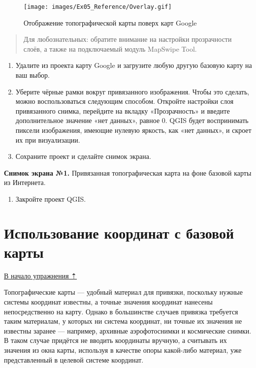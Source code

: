 \documentclass[
  12pt,
]{book}
\providecommand{\tightlist}{%
  \setlength{\itemsep}{0pt}\setlength{\parskip}{0pt}}
\begin{document}
\begin{figure}
\centering
\texttt{[image: images/Ex05\_Reference/Overlay.gif]}
\caption{Отображение топографической карты поверх карт Google}
\end{figure}

\begin{quote}
Для любознательных: обратите внимание на настройки прозрачности слоёв, а также на подключаемый модуль MapSwipe Tool.
\end{quote}

\begin{enumerate}
\def\labelenumi{\arabic{enumi}.}
\setcounter{enumi}{6}
\item
  Удалите из проекта карту Google и загрузите любую другую базовую карту на ваш выбор.
\item
  Уберите чёрные рамки вокруг привязанного изображения. Чтобы это сделать, можно воспользоваться следующим способом. Откройте настройки слоя привязанного снимка, перейдите на вкладку «Прозрачность» и введите дополнительное значение «нет данных», равное 0. QGIS будет воспринимать пиксели изображения, имеющие нулевую яркость, как «нет данных», и скроет их при визуализации.
\item
  Сохраните проект и сделайте снимок экрана.
\end{enumerate}

\textbf{Снимок экрана №1.} Привязанная топографическая карта на фоне базовой карты из Интернета.

\begin{enumerate}
\def\labelenumi{\arabic{enumi}.}
\setcounter{enumi}{9}
\tightlist
\item
  Закройте проект QGIS.
\end{enumerate}

\hypertarget{raster-reference-frommap}{%
\section{Использование координат с базовой карты}\label{raster-reference-frommap}}

\protect\hyperlink{raster-reference}{В начало упражнения ⇡}

Топографические карты --- удобный материал для привязки, поскольку нужные системы координат известны, а точные значения координат нанесены непосредственно на карту. Однако в большинстве случаев привязка требуется таким материалам, у которых ни система координат, ни точные их значения не известны заранее --- например, архивные аэрофотоснимки и космические снимки. В таком случае придётся не вводить координаты вручную, а считывать их значения из окна карты, используя в качестве опоры какой-либо материал, уже представленный в целевой системе координат.
\end{document}
